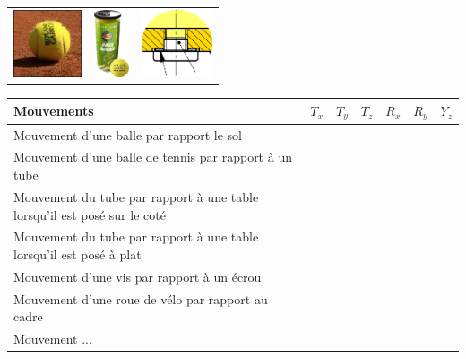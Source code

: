 \documentclass[10pt,oneside]{article}
\begin{document}
\begin{exemple}
\begin{center}
\begin{tabular}{ccc}
\includegraphics[height=2cm]{png/balle} 
& \includegraphics[height=2cm]{png/tube} 
& \includegraphics[height=2cm]{png/vis} 
\end{tabular}
\end{center}


\begin{center}
\begin{tabular}{|l|c|c|c|c|c|c|}

\hline 
Mouvements & $T_x$ & $T_y$ & $T_z$ &  $R_x$ &  $R_y$ &  $Y_z$ \\
\hline 
Mouvement d'une balle par rapport le sol & & & & & & \\
\hline 
Mouvement d'une balle de tennis par rapport à un tube & & & & & & \\
\hline 
Mouvement du tube par rapport à une table lorsqu'il est posé sur le coté  & & & & & & \\
\hline 
Mouvement du tube par rapport à une table lorsqu'il est posé à plat  & & & & & & \\
\hline 
Mouvement d'une vis par rapport à un écrou  & & & & & & \\
\hline 
Mouvement d'une roue de vélo par rapport au cadre  & & & & & & \\
\hline 
Mouvement ... & & & & & & \\
\hline 
\end{tabular}
\end{center}

\end{exemple}
\end{document}
